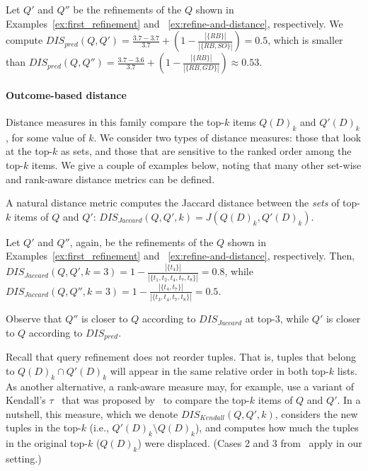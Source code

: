 \begin{example}
    Let $Q'$ and $Q''$ be the refinements of the \running{} $Q$ shown in Examples~\ref{ex:first_refinement} and ~\ref{ex:refine-and-distance}, respectively. We compute $DIS_{pred}(Q,Q') = \frac{3.7 - 3.7}{3.7} + (1 - \frac{|\{RB\}|}{|\{RB, SO\}|}) = 0.5$, which is smaller than $DIS_{pred}(Q,Q'') = \frac{3.7 - 3.6}{3.7} + (1 - \frac{|\{RB\}|}{|\{RB, GD\}|}) \approx 0.53$.
\end{example}    
\paragraph*{\textbf{Outcome-based distance}} 
Distance measures in this family compare the top-$k$ items $Q(D)_k$ and $Q'(D)_k$, for some value of $k$.  %
We consider two types of distance measures: those that look at the top-$k$ as sets, and those that are sensitive to the ranked order among the top-$k$ items.  We give a couple of examples below, noting that many other set-wise and rank-aware distance metrics can be defined.

A natural distance metric computes the Jaccard distance between the \emph{sets} of top-$k$ items of $Q$ and $Q'$: $DIS_{Jaccard}(Q, Q', k) = J(Q(D)_k, Q'(D)_k)$.
\begin{example}
Let $Q'$ and $Q''$, again, be the refinements of the \running{} $Q$ shown in Examples~\ref{ex:first_refinement} and ~\ref{ex:refine-and-distance}, respectively.
Then, $DIS_{Jaccard}(Q, Q',k=3) = 1 - \frac{|\{t_4\}|}{|\{t_1, t_2, t_4, t_7, t_8\}|} = 0.8$, while $DIS_{Jaccard}(Q, Q'', k=3) = 1 - \frac{|\{t_4, t_7\}|}{|\{t_3, t_4, t_7, t_8\}|} = 0.5$. 
\end{example}

Observe that $Q''$ is closer to $Q$ according to $DIS_{Jaccard}$ at top-$3$, while $Q'$ is closer to $Q$ according to $DIS_{pred}$.

Recall that query refinement does not reorder tuples.  That is, tuples that belong to $Q(D)_k \cap Q'(D)_k$ will appear in the same relative order in both top-$k$ lists. As another alternative, a rank-aware measure may, for example, use a variant of Kendall's $\tau$~\cite{10.1093/biomet/30.1-2.81} that was proposed by~\citet{FKS03} to compare the top-$k$ items of $Q$ and $Q'$. In a nutshell, this measure, which we denote $DIS_{Kendall}(Q, Q',k)$, considers the new tuples in the top-$k$ (i.e.,  $Q'(D)_k \setminus Q(D)_k$), and computes how much the tuples in the original top-$k$ ($Q(D)_k$) were displaced. (Cases 2 and 3 from~\cite{FKS03} apply in our setting.) %


